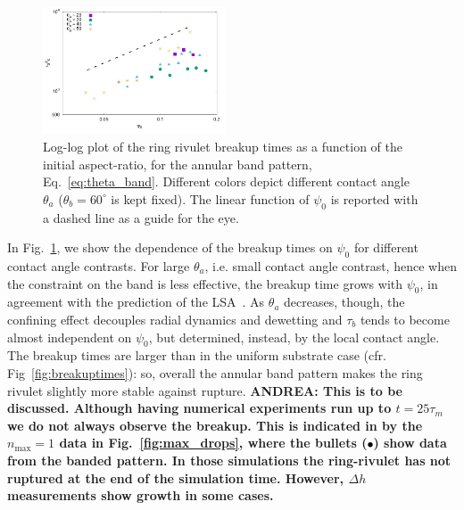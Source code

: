 \documentclass[twoside,twocolumn,9pt]{article}
\begin{document}
\begin{figure}
    \centering
    \includegraphics[width=0.48\textwidth]{taub_vs_psi0_pattern_annular.pdf}
    \caption{Log-log plot of the ring rivulet breakup times as a function of the initial aspect-ratio, for the annular band pattern, Eq.~\ref{eq:theta_band}.
    Different colors depict different contact angle $\theta_a$ ($\theta_b = 60^{\circ}$ is kept fixed).
    The linear function of $\psi_0$ is reported with a dashed line as a guide for the eye.
    }
    \label{fig:bandBreakupT}
\end{figure}
In Fig.~\ref{fig:bandBreakupT}, we show the dependence of the breakup times on $\psi_0$ for different contact angle contrasts. For large $\theta_a$, i.e. small contact angle contrast, hence 
when the constraint on the band is less effective, the breakup time grows with $\psi_0$, in agreement with the prediction of the LSA~\cite{gonzalezStabilityLiquidRing2013}. As $\theta_a$ decreases, though, the confining effect decouples radial dynamics and dewetting and $\tau_b$ tends to become almost independent on 
$\psi_0$, but determined, instead, by the local contact angle. The breakup times are larger than in the uniform substrate case (cfr. Fig~\ref{fig:breakuptimes}): so, overall the annular band pattern 
makes the ring rivulet slightly more stable against rupture.
{\bf ANDREA: This is to be discussed.
Although having numerical experiments run up to $t = 25\tau_m$ we do not always observe the breakup. 
This is indicated in by the $n_{\max} = 1$ data in Fig.~\ref{fig:max_drops}, where the bullets (\textcolor{black}{$\bullet$}) show data from the banded pattern. 
In those simulations the ring-rivulet has not ruptured at the end of the simulation time.
However, $\Delta h$ measurements show growth in some cases.}
\end{document}
